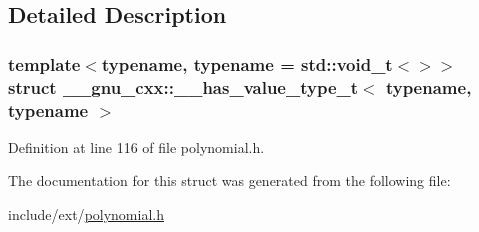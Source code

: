 \subsection{Detailed Description}
\subsubsection*{template$<$typename, typename = std\+::void\+\_\+t$<$$>$$>$\newline
struct \+\_\+\+\_\+gnu\+\_\+cxx\+::\+\_\+\+\_\+has\+\_\+value\+\_\+type\+\_\+t$<$ typename, typename $>$}



Definition at line 116 of file polynomial.\+h.



The documentation for this struct was generated from the following file\+:\begin{DoxyCompactItemize}
\item 
include/ext/\hyperlink{polynomial_8h}{polynomial.\+h}\end{DoxyCompactItemize}
